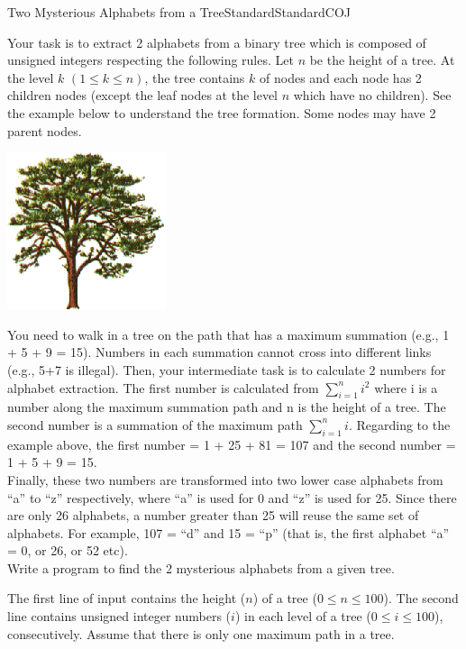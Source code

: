 \begin{problema}{Two Mysterious Alphabets from a Tree}{Standard}{Standard}{COJ}

Your task is to extract 2 alphabets from a binary tree which is composed of unsigned integers respecting the following rules. Let $n$ be the height of a tree. At the level $k$ $(1 \leq k \leq n)$, the tree contains $k$ of nodes and each node has 2 children nodes (except the leaf nodes at the level $n$ which have no children). See the example below to understand the tree formation. Some nodes may have 2 parent nodes. \\

\begin{center}
 \includegraphics{Graficos/tree}
\end{center}

You need to walk in a tree on the path that has a maximum summation (e.g., 1 + 5 + 9 = 15). Numbers in each summation cannot cross into different links (e.g., 5+7 is illegal). Then, your intermediate task is to calculate 2 numbers for alphabet extraction. The first number is calculated from $\sum_{i=1}^{n}{i^2}$ where i is a number along the maximum summation path and n is the height of a tree. The second number is a summation of the maximum path $\sum_{i=1}^{n}{i}$. Regarding to the example above, the first number = 1 + 25 + 81 = 107 and the second number = 1 + 5 + 9 = 15. \\

Finally, these two numbers are transformed into two lower case alphabets from ``a'' to ``z'' respectively, where ``a'' is used for 0 and ``z'' is used for 25. Since there are only 26 alphabets, a number greater than 25 will reuse the same set of alphabets. For example, 107 = ``d'' and 15 = ``p'' (that is, the first alphabet ``a'' = 0, or 26, or 52 etc). \\

Write a program to find the 2 mysterious alphabets from a given tree.

\InputFile

The first line of input contains the height ($n$) of a tree ($0 \le n \le 100$). The second line contains unsigned integer numbers ($i$) in each level of a tree ($0 \le i \le 100$), consecutively. Assume that there is only one maximum path in a tree. \\



\end{problema}
